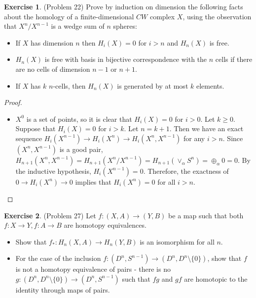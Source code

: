 \documentclass[12pt, psamsfonts]{amsart}
\theoremstyle{definition}
\newtheorem*{exer}{Exercise}
\theoremstyle{remark}
\numberwithin{equation}{section}
\begin{document}
\begin{exer}{(Problem 22)}
  Prove by induction on dimension the following facts about the homology of a finite-dimensional $CW$ complex $X$, using the observation that $X^n / X^{n-1}$ is a wedge sum of $n$ spheres:
  \begin{itemize}
    \item
      If $X$ has dimension $n$ then $H_i(X) = 0$ for $i > n$ and $H_n(X)$ is free.
    \item
      $H_n(X)$ is free with basis in bijective correspondence with the $n$ cells if there are no cells of dimension $n - 1$ or $n + 1$.
    \item
      If $X$ has $k$ $n$-cells, then $H_n(X)$ is generated by at most $k$ elements.
  \end{itemize}
\end{exer}

\begin{proof}
$ $
  \begin{itemize}
    \item
      $X^0$ is a set of points, so it is clear that $H_i(X) = 0$ for $i > 0$.
      Let $k \geq 0$.
      Suppose that $H_i(X) = 0$ for $i > k$.
      Let $n = k + 1$.
      Then we have an exact sequence $H_{i}(X^{n - 1}) \rightarrow H_{i}(X^n) \rightarrow H_{i}(X^n, X^{n - 1})$ for any $i > n$.
      Since $(X^n, X^{n - 1})$ is a good pair, $H_{n + 1}(X^n, X^{n - 1}) = H_{n + 1}(X^n / X^{n - 1}) = H_{n + 1}(\vee_{\alpha} S^n) = \oplus_{\alpha} 0 = 0$.
      By the inductive hypothesis, $H_i(X^{n - 1}) = 0$.
      Therefore, the exactness of $0 \rightarrow H_i(X^n) \rightarrow 0$ implies that $H_i(X^n) = 0$ for all $i > n$.
  \end{itemize}
\end{proof}

\begin{exer}{(Problem 27)}
  Let $f:(X, A) \rightarrow (Y, B)$ be a map such that both $f: X \rightarrow Y, f:A \rightarrow B$ are homotopy equivalences.

  \begin{itemize}
    \item
      Show that $f_* : H_n(X, A) \rightarrow  H_n(Y, B)$ is an isomorphism for all $n$.
    \item
      For the case of the inclusion $f:(D^n, S^{n - 1}) \rightarrow (D^n, D^n \setminus \{ 0 \})$, show that $f$ is not a homotopy equivalence of pairs -
      there is no $g: (D^n, D^n \setminus \{ 0 \}) \rightarrow (D^n, S^{n - 1})$ such that $fg$ and $gf$ are homotopic to the identity through maps of pairs.
  \end{itemize}
\end{exer}
\end{document}
